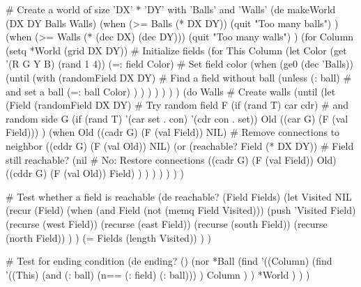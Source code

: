 \begin{wideverbatim}

# Create a world of size 'DX' * 'DY' with 'Balls' and 'Walls'
(de makeWorld (DX DY Balls Walls)
   (when (>= Balls (* DX DY))
      (quit "Too many balls") )
   (when (>= Walls (* (dec DX) (dec DY)))
      (quit "Too many walls") )
   (for Column (setq *World (grid DX DY))          # Initialize fields
      (for This Column
         (let Color (get '(R G Y B) (rand 1 4))
            (=: field Color)                       # Set field color
            (when (ge0 (dec 'Balls))
               (until
                  (with (randomField DX DY)        # Find a field without ball
                     (unless (: ball)              # and set a ball
                        (=: ball Color) ) ) ) ) ) ) )
   (do Walls                              # Create walls
      (until
         (let
            (Field (randomField DX DY)    # Try random field
               F (if (rand T) car cdr)    # and random side
               G (if (rand T) '(car set . con) '(cdr con . set))
               Old ((car G) (F (val Field))) )
            (when Old
               ((cadr G) (F (val Field)) NIL)  # Remove connections to neighbor
               ((cddr G) (F (val Old)) NIL)
               (or
                  (reachable? Field (* DX DY))  # Field still reachable?
                  (nil                          # No: Restore connections
                     ((cadr G) (F (val Field)) Old)
                     ((cddr G) (F (val Old)) Field) ) ) ) ) ) ) )

# Test whether a field is reachable
(de reachable? (Field Fields)
   (let Visited NIL
      (recur (Field)
         (when (and Field (not (memq Field Visited)))
            (push 'Visited Field)
            (recurse (west Field))
            (recurse (east Field))
            (recurse (south Field))
            (recurse (north Field)) ) )
      (= Fields (length Visited)) ) )

# Test for ending condition
(de ending? ()
   (nor
      *Ball
      (find
         '((Column)
            (find
               '((This)
                  (and (: ball) (n== (: field) (: ball))) )
               Column ) )
         *World ) ) )

\end{wideverbatim}

